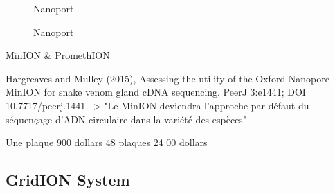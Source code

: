 \documentclass[a4paper]{article}
\begin{document}
\begin{figure}[!h]
\caption{Nanoport}
\end{figure}

\begin{figure}[!h]
\caption{Nanoport}
\end{figure}

MinION & PromethION

Hargreaves and Mulley (2015), Assessing the utility of the Oxford Nanopore MinION for snake venom gland cDNA sequencing. PeerJ 3:e1441; DOI 10.7717/peerj.1441
--> "Le MinION deviendra l'approche par défaut du séquençage d'ADN circulaire dans la variété des espèces"

Une plaque 900 dollars
48 plaques 24 00 dollars

\subsection{GridION System}
\end{document}
